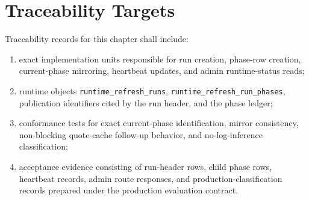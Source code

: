 \section{Traceability Targets}
Traceability records for this chapter shall include:
\begin{enumerate}[leftmargin=1.2cm]
    \item exact implementation units responsible for run creation, phase-row creation, current-phase mirroring, heartbeat updates, and admin runtime-status reads;
    \item runtime objects \texttt{runtime\_refresh\_runs}, \texttt{runtime\_refresh\_run\_phases}, publication identifiers cited by the run header, and the phase ledger;
    \item conformance tests for exact current-phase identification, mirror consistency, non-blocking quote-cache follow-up behavior, and no-log-inference classification;
    \item acceptance evidence consisting of run-header rows, child phase rows, heartbeat records, admin route responses, and production-classification records prepared under the production evaluation contract.
\end{enumerate}
